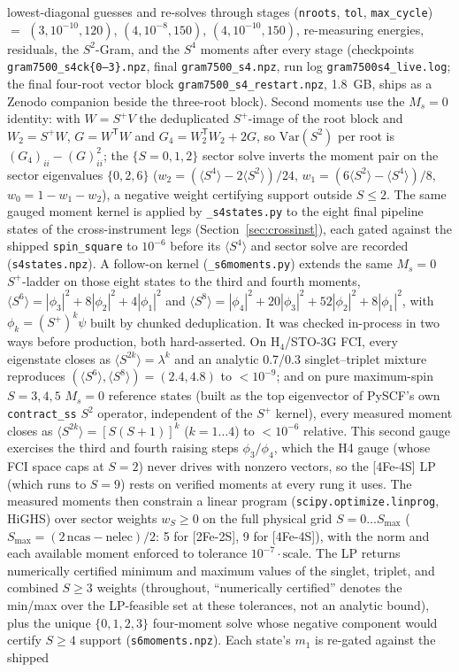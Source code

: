 \documentclass[11pt]{article}
\newcommand{\ssq}{\ensuremath{\langle S^2\rangle}}
\begin{document}
lowest-diagonal guesses and re-solves through stages (\texttt{nroots}, \texttt{tol}, \texttt{max\_cycle}) $=$ $(3, 10^{-10}, 120)$, $(4, 10^{-8}, 150)$, $(4, 10^{-10}, 150)$, re-measuring energies, residuals, the $S^2$-Gram, and the $S^4$ moments after every stage (checkpoints \texttt{gram7500\_s4ck\{0--3\}.npz}, final \texttt{gram7500\_s4.npz}, run log \texttt{gram7500s4\_live.log}; the final four-root vector block \texttt{gram7500\_s4\_restart.npz}, 1.8~GB, ships as a Zenodo companion beside the three-root block). Second moments use the $M_s = 0$ identity: with $W = S^+V$ the deduplicated $S^+$-image of the root block and $W_2 = S^+W$, $G = W^{\mathsf{T}}W$ and $G_4 = W_2^{\mathsf{T}}W_2 + 2G$, so $\mathrm{Var}(S^2)$ per root is $(G_4)_{ii} - (G)_{ii}^2$; the $\{S = 0, 1, 2\}$ sector solve inverts the moment pair on the sector eigenvalues $\{0, 2, 6\}$ ($w_2 = (\langle S^4\rangle - 2\ssq)/24$, $w_1 = (6\ssq - \langle S^4\rangle)/8$, $w_0 = 1 - w_1 - w_2$), a negative weight certifying support outside $S \le 2$. The same gauged moment kernel is applied by \texttt{\_s4states.py} to the eight final pipeline states of the cross-instrument legs (Section~\ref{sec:crossinst}), each gated against the shipped \texttt{spin\_square} to $10^{-6}$ before its $\langle S^4\rangle$ and sector solve are recorded (\texttt{s4states.npz}). A follow-on kernel (\texttt{\_s6moments.py}) extends the same $M_s = 0$ $S^+$-ladder on those eight states to the third and fourth moments, $\langle S^6\rangle = |\phi_3|^2 + 8|\phi_2|^2 + 4|\phi_1|^2$ and $\langle S^8\rangle = |\phi_4|^2 + 20|\phi_3|^2 + 52|\phi_2|^2 + 8|\phi_1|^2$, with $\phi_k = (S^+)^k\psi$ built by chunked deduplication. It was checked in-process in two ways before production, both hard-asserted. On H$_4$/STO-3G FCI, every eigenstate closes as $\langle S^{2k}\rangle = \lambda^k$ and an analytic 0.7/0.3 singlet--triplet mixture reproduces $(\langle S^6\rangle, \langle S^8\rangle) = (2.4, 4.8)$ to $<10^{-9}$; and on pure maximum-spin $S = 3, 4, 5$ $M_s = 0$ reference states (built as the top eigenvector of PySCF's own \texttt{contract\_ss} $S^2$ operator, independent of the $S^+$ kernel), every measured moment closes as $\langle S^{2k}\rangle = [S(S+1)]^k$ ($k = 1\ldots4$) to $<10^{-6}$ relative. This second gauge exercises the third and fourth raising steps $\phi_3/\phi_4$, which the H4 gauge (whose FCI space caps at $S = 2$) never drives with nonzero vectors, so the [4Fe-4S] LP (which runs to $S = 9$) rests on verified moments at every rung it uses. The measured moments then constrain a linear program (\texttt{scipy.optimize.linprog}, HiGHS) over sector weights $w_S \ge 0$ on the full physical grid $S = 0\ldots S_{\max}$ ($S_{\max} = (2\,\mathrm{ncas} - \mathrm{nelec})/2$: 5 for [2Fe-2S], 9 for [4Fe-4S]), with the norm and each available moment enforced to tolerance $10^{-7}\cdot\text{scale}$. The LP returns numerically certified minimum and maximum values of the singlet, triplet, and combined $S \ge 3$ weights (throughout, ``numerically certified'' denotes the min/max over the LP-feasible set at these tolerances, not an analytic bound), plus the unique $\{0,1,2,3\}$ four-moment solve whose negative component would certify $S \ge 4$ support (\texttt{s6moments.npz}). Each state's $m_1$ is re-gated against the shipped 
\end{document}
